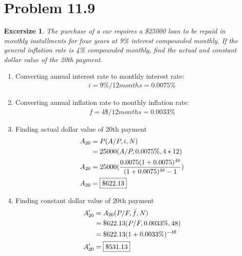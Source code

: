 \documentclass[../INDE250HW.tex]{subfiles}
\newtheorem{exrc}{Excersize}
\begin{document}
\section*{Problem 11.9}
\begin{exrc}
    The purchase of a car requires a \$25000 loan to be repaid in monthly installments for four years at 9\% interest compounded monthly. If the general inflation rate is 4\% compounded monthly, find the actual and constant dollar value of the 20th payment.
\end{exrc}
\begin{enumerate}
    \item Converting annual interest rate to monthly interest rate:
        \begin{equation*}
            \begin{aligned}
                i = 9\%/12months = 0.0075\%
            \end{aligned}
        \end{equation*}
    \item Converting annual inflation rate to monthly inflation rate:
        \begin{equation*}
            \begin{aligned}
                f = 4\$/12months = 0.0033\%
            \end{aligned}
        \end{equation*}
    \item Finding actual dollar value of 20th payment %
        \begin{equation*}
            \begin{aligned}
                A_{20} &= P(A/P,i,N) \\
                        &= 25000(A/P, 0.0075\%,4*12) \\
                A_{20} &= 25000(\frac{0.0075(1+0.0075)^{48}}{(1+0.0075)^{48}-1}) \\
                A_{20} &= \framebox{$\$622.13$}
            \end{aligned}
        \end{equation*}
    \item Finding constant dollar value of 20th payment %
        \begin{equation*}
            \begin{aligned}
                A'_{20} &= A_{20}(P/F,\bar{f},N) \\
                        &= \$622.13(P/F,0.0033\%,48) \\
                        &= \$622.13(1 + 0.0033\%)^{-48}\\
                A'_{20} &= \framebox{$\$531.13$}
            \end{aligned}
        \end{equation*}
\end{enumerate}
\end{document}
